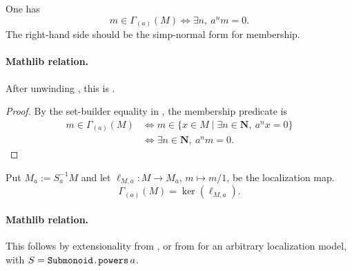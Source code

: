 \begin{lemma}
  \label{lemma:nagata-mem-power-torsion}

  One has
  \[
    m\in\Gamma_{(a)}(M)
      \Longleftrightarrow
    \exists n,\ a^nm=0.
  \]
  The right-hand side should be the simp-normal form for membership.

  \paragraph{Mathlib relation.}
  After unwinding \texttt{}, this is
  \texttt{}.
\end{lemma}

\begin{proof}
  By the set-builder equality in , the
  membership predicate is
  \[
  \begin{aligned}
    m\in\Gamma_{(a)}(M)
      &\Longleftrightarrow
        m\in\{x\in M\mid\exists n\in\mathbf N,\ a^nx=0\}\\
      &\Longleftrightarrow
        \exists n\in\mathbf N,\ a^nm=0.
  \end{aligned}
  \]
\end{proof}

\begin{lemma}
  \label{lemma:nagata-power-torsion-kernel-localization}

  Put $M_a:=S_a^{-1}M$ and let
  $\ell_{M,a}\colon M\to M_a$, $m\mapsto m/1$, be the localization map.
  \[
    \Gamma_{(a)}(M)=\ker(\ell_{M,a}).
  \]

  \paragraph{Mathlib relation.}
  This follows by extensionality from
  \texttt{}, or from
  \texttt{} for an arbitrary
  localization model, with
  $S=\texttt{\detokenize{Submonoid.powers}}\,a$.
\end{lemma}

